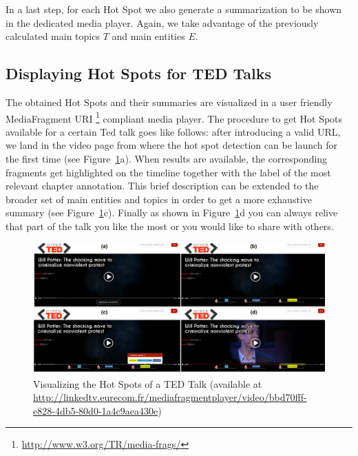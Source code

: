 \documentclass{llncs}
\begin{document}

In a last step, for each Hot Spot we also generate a summarization to be shown in the dedicated media player. Again, we take advantage of the previously calculated main topics $T$ and main entities $E$.

\subsection{Displaying Hot Spots for TED Talks}
\label{sec:usecase}
The obtained Hot Spots and their summaries are visualized in a user friendly MediaFragment URI \footnote{\fontsize{8pt}{1em}\selectfont \url{http://www.w3.org/TR/media-frags/}} compliant media player. The procedure to get Hot Spots available for a certain Ted talk goes like follows: after introducing a valid URL, we land in the video page from where the hot spot detection can be launch for the first time (see Figure~\ref{fig:demoScreenShots}a). When results are available, the corresponding fragments get highlighted on the timeline together with the label of the most relevant chapter annotation. This brief description can be extended to the broader set of main entities and topics in order to get a more exhaustive summary (see Figure~\ref{fig:demoScreenShots}c). Finally as shown in Figure~\ref{fig:demoScreenShots}d you can always relive that part of the talk you like the most or you would like to share with others.

\begin{figure}[h!]
\centering
\includegraphics[width=1\textwidth]{figure/Ted_U}
\caption{Visualizing the Hot Spots of a TED Talk (available at \fontsize{8pt}{1em}\selectfont \protect\url{http://linkedtv.eurecom.fr/mediafragmentplayer/video/bbd70fff-e828-4db5-80d0-1a4c9aea430e})}
\label{fig:demoScreenShots}%
\end{figure}
\end{document}
